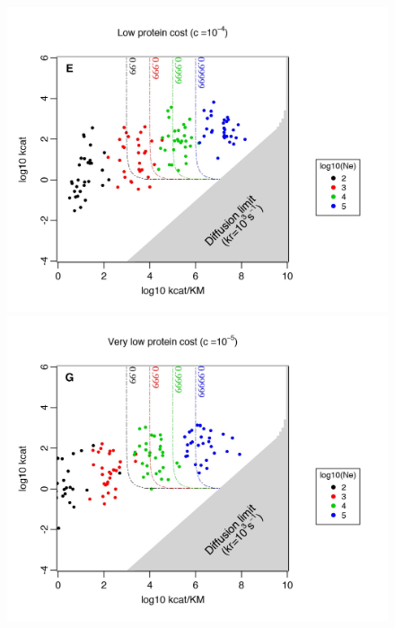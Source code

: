 \begin{figure}[!p]
\begin{center}
\begin{minipage}[c]{0.6\textwidth}
\begin{center}
    \includegraphics[scale=0.52,trim=0cm 0cm 0cm 0cm,clip]{pics/SM-Enzymes/Evo_Results_Cost_L.jpeg}
    \includegraphics[scale=0.52,trim=0cm 0cm 0cm 0cm,clip]{pics/SM-Enzymes/Evo_Results_Cost_VL.jpeg}
    \end{center}
  \end{minipage}\hfill
  \begin{minipage}[c]{0.4\textwidth}

\end{minipage}
\end{center}
\end{figure}
